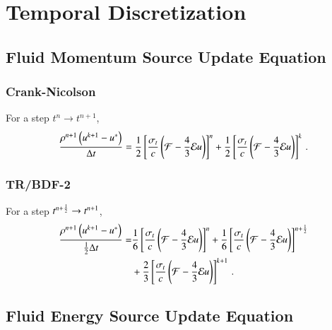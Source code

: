 \section{Temporal Discretization}
\subsection{Fluid Momentum Source Update Equation}
\subsubsection{Crank-Nicolson}
For a step $t^n\rightarrow t^{n+1}$,
\begin{equation}
  \frac{\rho^{n+1}\left(u^{k+1}-u^*\right)}{\Delta t} = 
   \frac{1}{2}\left[\frac{\sigma_{t}}{c}\left(\mathcal{F}-\frac{4}{3}\mathcal{E} u\right)\right]^n
  +\frac{1}{2}\left[\frac{\sigma_{t}}{c}\left(\mathcal{F}-\frac{4}{3}\mathcal{E} u\right)\right]^k
  \, .
\end{equation}

\subsubsection{TR/BDF-2}
For a step $t^{n+\frac{1}{2}}\rightarrow t^{n+1}$,
\begin{equation}\begin{split}
  \frac{\rho^{n+1}\left(u^{k+1}-u^*\right)}{\frac{1}{2}\Delta t} =  
  & \frac{1}{6}\left[\frac{\sigma_{t}}{c}\left(\mathcal{F}-\frac{4}{3}\mathcal{E} u\right)\right]^n
   +\frac{1}{6}\left[\frac{\sigma_{t}}{c}\left(\mathcal{F}-\frac{4}{3}\mathcal{E} u\right)\right]^{n+\frac{1}{2}}\\
  &+\frac{2}{3}\left[\frac{\sigma_{t}}{c}\left(\mathcal{F}-\frac{4}{3}\mathcal{E} u\right)\right]^{k+1}
  \, .
\end{split}\end{equation}

\subsection{Fluid Energy Source Update Equation}
